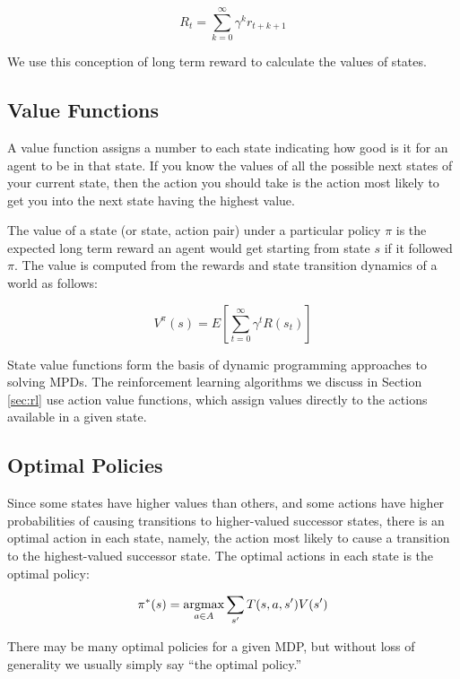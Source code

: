 \begin{equation}
R_t = \sum_{k=0}^{\infty} \gamma^k r_{t+k+1}
\end{equation}

We use this conception of long term reward to calculate the values of states.

\subsection{Value Functions}

A value function assigns a number to each state indicating how good is it for an agent to be in that state. If you know the values of all the possible next states of your current state, then the action you should take is the action most likely to get you into the next state having the highest value.

The value of a state (or state, action pair) under a particular policy $\pi$ is the expected long term reward an agent would get starting from state $s$ if it followed $\pi$. The value is computed from the rewards and state transition dynamics of a world as follows:

\begin{equation}
V^\pi(s) = E \left [ \sum_{t=0}^{\infty} \gamma^t R(s_t) \right ]
\end{equation}

State value functions form the basis of dynamic programming approaches to solving MPDs. The reinforcement learning algorithms we discuss in Section \ref{sec:rl} use action value functions, which assign values directly to the actions available in a given state.

\subsection{Optimal Policies}

Since some states have higher values than others, and some actions have higher probabilities of causing transitions to higher-valued successor states, there is an optimal action in each state, namely, the action most likely to cause a transition to the highest-valued successor state. The optimal actions in each state is the optimal policy:

\begin{equation}
\pi^*(s) = \operatorname*{argmax}_{a \in A} \sum_{s'} T(s, a, s') V(s')
\end{equation}

There may be many optimal policies for a given MDP, but without loss of generality we usually simply say ``the optimal policy.''

